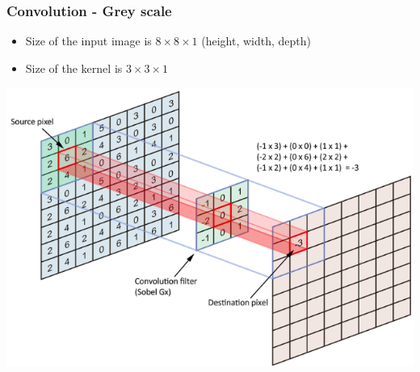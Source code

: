 \begin{frame}
	\frametitle{Convolution - Grey scale}

\begin{itemize}
	\item Size of the input image is $8 \times 8 \times 1$ (height, width, depth)

	\medskip

	\item Size of the kernel is $3 \times 3 \times 1$
\end{itemize}

\begin{center}
	\includegraphics[scale=0.3]{figs/convolution.png}
\end{center}

\end{frame}













